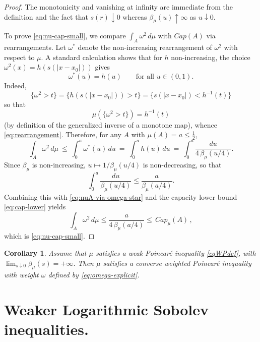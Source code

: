 \documentclass[11pt,reqno]{amsart}
\numberwithin{equation}{section}
\newtheorem{corollary}[theorem]{Corollary}
\theoremstyle{definition}
\theoremstyle{remark}
\begin{document}
\begin{proof}
The monotonicity and vanishing at infinity are immediate from the definition and the fact that $s(r)\downarrow0$ whereas $\beta_\mu(u)\uparrow\infty$ as $u\downarrow0$.

To prove \eqref{eq:nu-cap-small}, we compare $\int_A \omega^2\,d\mu$ with $Cap(A)$ via rearrangements.
Let $\omega^*$ denote the non-increasing rearrangement of $\omega^2$ with respect to $\mu$.
A standard calculation shows that for $h$ non-increasing, the choice $\omega^2(x)=h(s(|x-x_0|))$ gives
\begin{equation}\label{eq:rearrangement}
  \omega^*(u)=h(u)\qquad\text{for all }u\in(0,1). 
\end{equation}
Indeed,
$$
\{\omega^2>t\}=\{h(s(|x-x_0|))>t\}=\{s(|x-x_0|)<h^{-1}(t)\}
$$
so that
$$
\mu(\{\omega^2>t\})=h^{-1}(t)
$$
(by definition of the generalized inverse of a monotone map), whence \eqref{eq:rearrangement}.
Therefore, for any $A$ with $\mu(A)=a\le\tfrac12$,
\begin{equation}\label{eq:nuA-via-omega-star}
  \int_A \omega^2\,d\mu \ \le\ \int_0^{a} \omega^*(u)\,du \ =\ \int_0^{a} h(u)\,du
  \ =\ \int_0^{a} \frac{du}{4\,\beta_\mu(u/4)}.
\end{equation}
Since $\beta_\mu$ is non-increasing, $u\mapsto 1/\beta_\mu(u/4)$ is non-decreasing, so that
$$
\int_0^{a} \frac{du}{\beta_\mu(u/4)} \le \frac{a}{\beta_\mu(a/4)}.
$$
Combining this with \eqref{eq:nuA-via-omega-star} and the capacity lower bound \eqref{eq:cap-lower} yields
$$
\int_A \omega^2\,d\mu \le \frac{a}{4\,\beta_\mu(a/4)} \le \, Cap_\mu(A) \, ,
$$ which is \eqref{eq:nu-cap-small}.
\end{proof}

\begin{corollary}\label{corweaktoweight}
Assume that $\mu$ satisfies a weak Poincar\'e inequality \eqref{eqWPdef}, with $\lim_{s\downarrow 0}\beta_\mu(s)=+\infty$. 
Then $\mu$ satisfies a converse weighted Poincar\'e inequality with weight $\omega$ defined by \eqref{eq:omega-explicit}.
\end{corollary}


\section{Weaker Logarithmic Sobolev inequalities.}\label{secweakLS}
\end{document}
